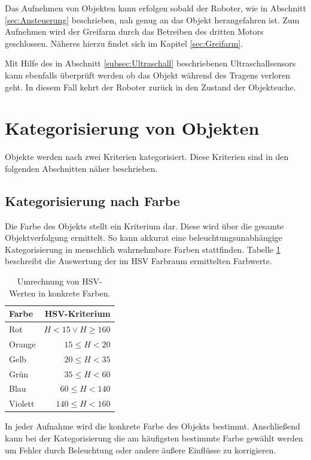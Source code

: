 Das Aufnehmen von Objekten kann erfolgen sobald der Roboter, wie in Abschnitt \ref{sec:Ansteuerung} beschrieben, nah genug an das Objekt herangefahren ist. Zum Aufnehmen wird der Greifarm durch das Betreiben des dritten Motors geschlossen. Näheres hierzu findet sich im Kapitel \ref{sec:Greifarm}. 

Mit Hilfe des in Abschnitt \ref{subsec:Ultraschall} beschriebenen Ultraschallsensors kann ebenfalls überprüft werden ob das Objekt während des Tragens verloren geht. In diesem Fall kehrt der Roboter zurück in den Zustand der Objektsuche.

\section{Kategorisierung von Objekten}

Objekte werden nach zwei Kriterien kategorisiert. Diese Kriterien sind in den folgenden Abschnitten näher beschrieben.

\subsection{Kategorisierung nach Farbe}
Die Farbe des Objekts stellt ein Kriterium dar. Diese wird über die gesamte Objektverfolgung ermittelt. So kann akkurat eine beleuchtungsunabhängige Kategorisierung in menschlich wahrnehmbare Farben stattfinden. Tabelle \ref{tab:Farbtabelle} beschreibt die Auswertung der im HSV Farbraum ermittelten Farbwerte.

\begin{table}
	\centering
	\begin{tabular}{lr}
		\toprule
		Farbe & HSV-Kriterium\\
		\midrule
		Rot & $H < 15\vee H \geq 160$ \\
		Orange & $15 \leq H < 20$ \\
		Gelb & $20 \leq H < 35$ \\
		Grün & $35 \leq H < 60$ \\
		Blau & $60 \leq H < 140$ \\
		Violett & $140 \leq H < 160$ \\
												
		\bottomrule
	\end{tabular}
	\caption{Umrechnung von HSV-Werten in konkrete Farben.}
	\label{tab:Farbtabelle}
\end{table}

In jeder Aufnahme wird die konkrete Farbe des Objekts bestimmt. Anschließend kann bei der Kategorisierung die am häufigsten bestimmte Farbe gewählt werden um Fehler durch Beleuchtung oder andere äußere Einflüsse zu korrigieren.

